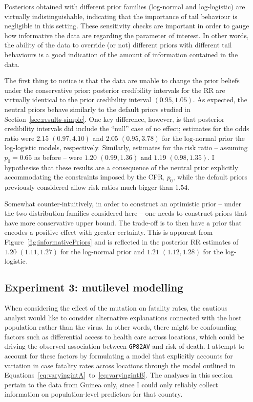 Posteriors obtained with different prior families (log-normal and log-logistic) are virtually indistinguishable, indicating that the importance of tail behaviour is negligible in this setting.
These sensitivity checks are important in order to gauge how informative the data are regarding the parameter of interest. 
In other words, the ability of the data to override (or not) different priors with different tail behaviours is a good indication of the amount of information contained in the data.

The first thing to notice is that the data are unable to change the prior beliefs under the conservative prior: posterior credibility intervals for the RR are virtually identical to the prior credibility interval $(0.95, 1.05)$.
As expected, the neutral priors behave similarly to the default priors studied in Section~\ref{sec:results-simple}. 
One key difference, however, is that posterior credibility intervals did include the ``null'' case of no effect; estimates for the odds ratio were $2.15$ $(0.97, 4.10)$ and $2.05$ $(0.95, 3.78)$ for the log-normal prior the log-logistic models, respectively.
Similarly, estimates for the risk ratio -- assuming $p_0 = 0.65$ as before -- were $1.20$ $(0.99, 1.36)$ and $1.19$ $(0.98, 1.35)$.
I hypothesise that these results are a consequence of the neutral prior explicitly accommodating the constraints imposed by the CFR, $p_0$, while the default priors previously considered allow risk ratios much bigger than $1.54$.

Somewhat counter-intuitively, in order to construct an optimistic prior -- under the two distribution families considered here -- one needs to construct priors that have more conservative upper bound.
The trade-off is to then have a prior that encodes a positive effect with greater certainty.
This is apparent from Figure~\ref{fig:informativePriors} and is reflected in the posterior RR estimates of $1.20$ $(1.11, 1.27)$ for the log-normal prior and $1.21$ $(1.12, 1.28)$ for the log-logistic.

\subsection*{Experiment 3: mutilevel modelling}
\label{sec:results-multilevel}

When considering the effect of the mutation on fatality rates, the cautious analyst would like to consider alternative explanations connected with the host population rather than the virus.
In other words, there might be confounding factors such as differential access to health care across locations, which could be driving the observed association between \verb|GP82AV| and risk of death.
I attempt to account for these factors by  formulating a model that explicitly accounts for variation in case fatality rates across locations through the model outlined in Equations~\ref{eq:varyingintA}~to~\ref{eq:varyingintB}.
The analyses in this section pertain to the data from Guinea only, since I could only reliably collect information on population-level predictors for that country.

